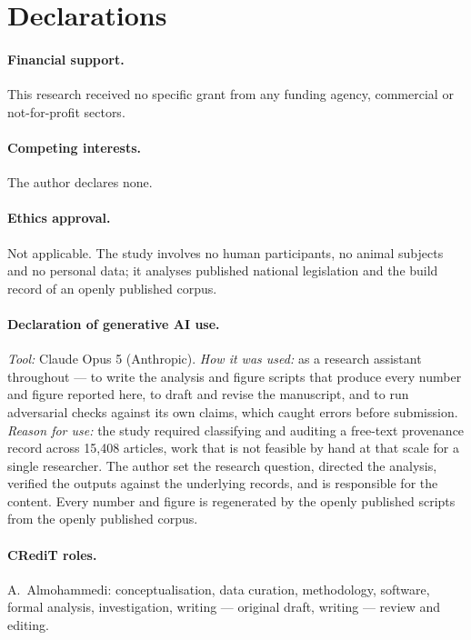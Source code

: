 \documentclass[11pt]{article}
\newif\ifanon
\begin{document}
\ifanon\else
\section*{Declarations}

\paragraph{Financial support.} This research received no specific grant from
any funding agency, commercial or not-for-profit sectors.

\paragraph{Competing interests.} The author declares none.

\paragraph{Ethics approval.} Not applicable. The study involves no human
participants, no animal subjects and no personal data; it analyses published
national legislation and the build record of an openly published corpus.

\paragraph{Declaration of generative AI use.} \emph{Tool:} Claude Opus 5
(Anthropic). \emph{How it was used:} as a research assistant throughout --- to
write the analysis and figure scripts that produce every number and figure
reported here, to draft and revise the manuscript, and to run adversarial
checks against its own claims, which caught errors before submission.
\emph{Reason for use:} the study required classifying and auditing a free-text
provenance record across 15,408 articles, work that is not feasible by hand at
that scale for a single researcher. The author set the research question,
directed the analysis, verified the outputs against the underlying records, and
is responsible for the content. Every number and figure is regenerated by the
openly published scripts from the openly published corpus.

\paragraph{CRediT roles.} A.~Almohammedi: conceptualisation, data curation,
methodology, software, formal analysis, investigation, writing --- original
draft, writing --- review and editing.
\end{document}
